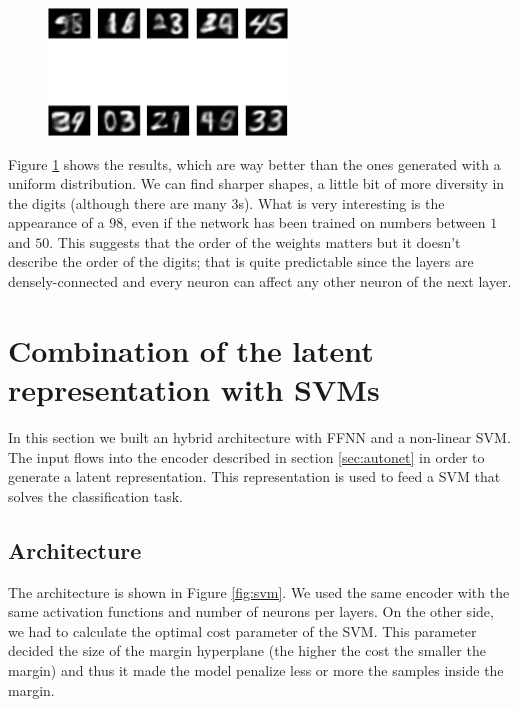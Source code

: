 \documentclass[compsoc]{IEEEtran}
\begin{document}
\begin{figure}[ht!]
\centering                                                                        
\includegraphics[width=2.5in]{gen.png}
\captionsetup{justification=centering}
\caption{}
\label{fig:gen}
\end{figure}

Figure \ref{fig:gen} shows the results, which are way better than the ones generated with a uniform distribution. We can find sharper shapes, a little bit of more
diversity in the digits (although there are many $3$s). What is very interesting is the appearance of a $98$, even if the network has been trained on numbers between $1$ and $50$. This suggests that the order of the weights matters but it doesn't describe the order of the digits; that is quite predictable since the layers are densely-connected and every neuron can affect any other neuron of the next layer.


\section{Combination of the latent representation with SVMs}
In this section we built an hybrid architecture with FFNN and a non-linear SVM. The input flows into the encoder described in section \ref{sec:autonet} in order to generate a latent representation. This representation is used to feed a SVM that solves the classification task. 
\subsection{Architecture}
The architecture is shown in Figure \ref{fig:svm}. We used the same encoder with the same activation functions and number of neurons per layers. On the other side,
we had to calculate the optimal cost parameter of the SVM. This parameter decided the size of the margin hyperplane (the higher the cost the smaller the margin) and thus it made the model penalize less or more the samples inside the margin. \par
\end{document}
